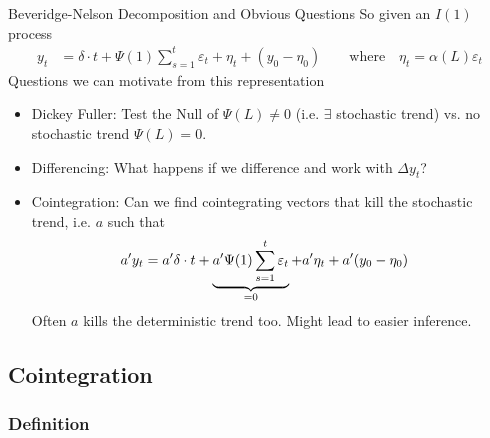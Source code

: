 \documentclass[aspectratio=169, handout]{beamer}
\begin{document}
{\footnotesize
\begin{frame}{Beveridge-Nelson Decomposition and Obvious Questions}
So given an $I(1)$ process
\begin{align*}
  y_t
  &=
  \delta \cdot t
  +
  \Psi(1)
  \sum_{s=1}^t
  \varepsilon_t
  +
  \eta_t
  +
  (y_0-\eta_0)
  \qquad\text{where}\quad
  \eta_t
  =
  \alpha(L)
  \varepsilon_t
\end{align*}
Questions we can motivate from this representation
\begin{itemize}
  \item Dickey Fuller: Test the Null of $\Psi(L)\neq 0$ (i.e. $\exists$
    stochastic trend) vs. no stochastic trend $\Psi(L)=0$.

  \pause
  \item Differencing:
    What happens if we difference and work with $\Delta y_t$?

  \pause
  \item
    Cointegration:
    Can we find \alert{cointegrating vectors} that kill the stochastic
    trend, i.e. $a$ such that
    \begin{align*}
      a'y_t
      &=
      a'\delta \cdot t
      +
      \underbrace{%
        a'\Psi(1)
        \sum_{s=1}^t
        \varepsilon_t
      }_{=0}
      +
      a'\eta_t
      +
      a'(y_0-\eta_0)
    \end{align*}
    Often $a$ kills the deterministic trend too.
    Might lead to easier inference.
\end{itemize}
\end{frame}
}



\subsection{Cointegration}


\subsubsection{Definition}
\end{document}
